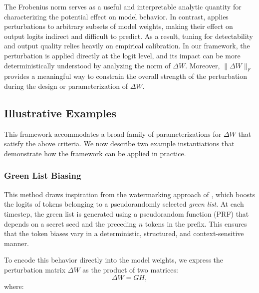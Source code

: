 The Frobenius norm serves as a useful and interpretable analytic quantity for characterizing the potential effect on model behavior. In contrast, \citet{block2025gaussmark} applies perturbations to arbitrary subsets of model weights, making their effect on output logits indirect and difficult to predict. As a result, tuning for detectability and output quality relies heavily on empirical calibration. In our framework, the perturbation is applied directly at the logit level, and its impact can be more deterministically understood by analyzing the norm of \( \Delta W \). Moreover, \( \|\Delta W\|_F \) provides a meaningful way to constrain the overall strength of the perturbation during the design or parameterization of \( \Delta W \).


\subsection{Illustrative Examples}
This framework accommodates a broad family of parameterizations for \( \Delta W \) that satisfy the above criteria. We now describe two example instantiations that demonstrate how the framework can be applied in practice.

\subsubsection{Green List Biasing}

This method draws inspiration from the watermarking approach of \citet{kirchenbauer2023watermark}, which boosts the logits of tokens belonging to a pseudorandomly selected \emph{green list}. At each timestep, the green list is generated using a pseudorandom function (PRF) that depends on a secret seed and the preceding \( n \) tokens in the prefix. This ensures that the token biases vary in a deterministic, structured, and context-sensitive manner.

To encode this behavior directly into the model weights, we express the perturbation matrix \( \Delta W \) as the product of two matrices:
\begin{equation}
    \Delta W = G H,
\end{equation}
where:

